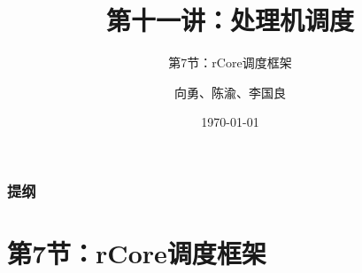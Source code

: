



\title[第10讲]{第十一讲：处理机调度} %
\subtitle{第7节：rCore调度框架}
\author{向勇、陈渝、李国良} %
\date{\today} %



\begin{frame}
\titlepage %
\end{frame}
\begin{frame}
\frametitle{提纲} %
\tableofcontents %
\end{frame}
\section{第7节：rCore调度框架}%
